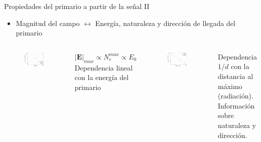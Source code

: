 \documentclass{beamer}
\newcommand{\vect}[1]{\boldsymbol{\mathbf{#1}}}
\begin{document}
\begin{frame}{Propiedades del primario a partir de la señal II}
	\begin{itemize}
		\item Magnitud del campo $\leftrightarrow$ Energía, naturaleza y dirección de llegada del primario 
	\end{itemize}
\begin{columns}
	\begin{figure}[H]
		\centering
		\includegraphics[width=1\linewidth]{figures/Radio_UG/85deg_varE_36km_Emax_vs_E}
	\end{figure}
\begin{block}{}
	\centering $\left|\vect{E}\right|_{max}\propto N_{e}^{max}\propto E_0$\\Dependencia lineal con la energía del primario
\end{block}
	\begin{figure}[H]
		\centering
		\includegraphics[width=1\linewidth]{figures/Radio_UG/85deg_1EeV_varh_Emax_vs_d}
	\end{figure}
\begin{block}{}
	\centering Dependencia $1/d$ con la distancia al máximo (radiación). Información sobre naturaleza y dirección.
\end{block}
\end{columns}
\end{frame}
\end{document}
